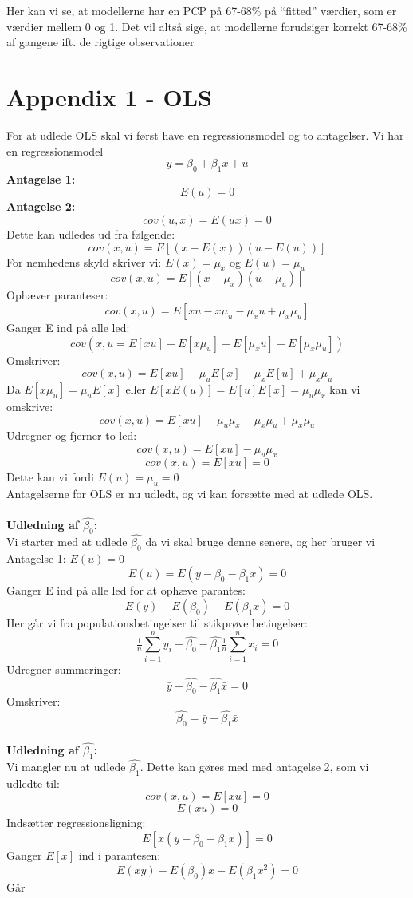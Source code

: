 \documentclass[
  10pt,
]{article}
\begin{document}
Her kan vi se, at modellerne har en PCP på 67-68\% på ``fitted''
værdier, som er værdier mellem 0 og 1. Det vil altså sige, at modellerne
forudsiger korrekt 67-68\% af gangene ift. de rigtige observationer
\newpage

\section{Appendix 1 - OLS}
\label{sec:OLS}

For at udlede OLS skal vi først have en regressionsmodel og to
antagelser. Vi har en regressionsmodel \[ y = \beta_0 + \beta_1x+u\]
\textbf{Antagelse 1:} \[E(u) = 0 \tag{Antagelse 1}\]
\textbf{Antagelse 2:} \[ cov(u,x) = E(ux) = 0 \tag{Antagelse 2}\] Dette
kan udledes ud fra følgende: \[cov(x,u) = E[(x-E(x))(u-E(u))]\tag{2a} \]
For nemhedens skyld skriver vi: \(E(x)=\mu_{x}\) og \(E(u)=\mu_u\)
\[cov(x,u)=E[(x-\mu_x)(u-\mu_u)] \tag{2b} \] Ophæver paranteser:
\[cov(x,u)=E[xu-x\mu_u-\mu_xu+\mu_x\mu_u] \tag{2c} \] Ganger E ind på
alle led: \[cov(x,u=E[xu]-E[x\mu_u]-E[\mu_xu]+E[\mu_x\mu_u])\tag{2d} \]
Omskriver: \[cov(x,u)=E[xu]-\mu_uE[x]-\mu_xE[u]+\mu_x\mu_u \tag{2e}\] Da
\(E[x\mu_u]=\mu_uE[x]\) eller \(E[xE(u)]=E[u]E[x]=\mu_u\mu_x\) kan vi
omskrive:
\[ cov(x,u) = E[xu]-\mu_u\mu_x-\mu_x\mu_u+\mu_x\mu_u \tag{2f}\] Udregner
og fjerner to led: \[cov(x,u) = E[xu]-\mu_u\mu_x \tag{2g}\]
\[cov(x,u)=E[xu]=0 \tag{2h}\] Dette kan vi fordi \(E(u)=\mu_u=0\)\\
Antagelserne for OLS er nu udledt, og vi kan forsætte med at udlede
OLS.\\
~\\
\textbf{Udledning af $\hat{\beta_0}$:}\\
Vi starter med at udlede \(\hat{\beta_0}\) da vi skal bruge denne
senere, og her bruger vi Antagelse 1: \(E(u)=0\)
\[E(u)=E(y-\beta_0-\beta_1x)=0 \] Ganger E ind på alle led for at ophæve
parantes: \[E(y)-E(\beta_0)-E(\beta_1x)=0 \] Her går vi fra
populationsbetingelser til stikprøve betingelser:
\[\tfrac{1}{n}\sum\limits_{i=1}^ny_i-\hat{\beta_0}-\hat{\beta_1}\tfrac{1}{n}\sum\limits_{i=1}^nx_i=0 \]
Udregner summeringer: \[\bar{y}-\hat{\beta_0}-\hat{\beta_1}\bar{x}=0 \]
Omskriver: \[\hat{\beta_0}=\bar{y}-\hat{\beta_1}\bar{x} \]\\
\textbf{Udledning af $\hat{\beta_1}$:}\\
Vi mangler nu at udlede \(\hat{\beta_1}\). Dette kan gøres med med
antagelse 2, som vi udledte til: \[cov(x,u)=E[xu]=0\] \[E(xu)=0 \]
Indsætter regressionsligning: \[E[x(y-\beta_0-\beta_1x)]=0 \] Ganger
\(E[x]\) ind i parantesen: \[E(xy)-E(\beta_0)x-E(\beta_1x^2)=0 \] Går
\end{document}
